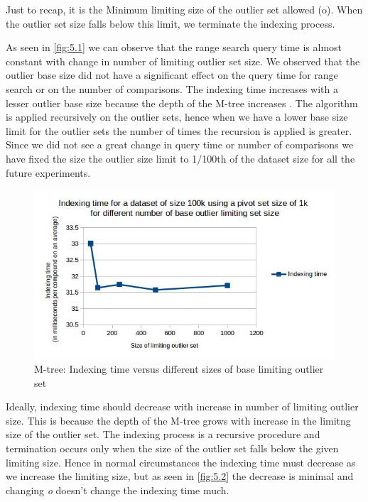 Just to recap, it is the Minimum limiting size of the outlier set allowed (o). When the outlier set size falls below this limit, we terminate the indexing process.

As seen in \ref{fig:5.1} we can observe that the range search query time is almost constant with change in number of limiting outlier set size. We observed that the outlier base size did not have a significant effect on the query time for range search or on the number of comparisons. The indexing time increases with a lesser outlier base size because the depth of the M-tree increases . The algorithm is applied recursively on the outlier sets, hence when we have a lower base size limit for the outlier sets the number of times the recursion is applied is greater. Since we did not see a great change in query time or number of comparisons we have fixed the size the outlier size limit to 1/100th of the dataset size for all the future experiments.


\begin{figure}[ht!]	
\centering
\includegraphics[width=1 \columnwidth]{img/image8.jpg}
\caption{M-tree: Indexing time versus different sizes of base limiting outlier set}
\label{fig:5.2}
\end{figure}


Ideally, indexing time should decrease with increase in number of limiting outlier size. This is because the depth of the M-tree grows with increase in the limitng size of the outlier set. The indexing process is a recursive procedure and termination occurs only when the size of the outlier set falls below the given limiting size. Hence in normal circumstances the indexing time must decrease as we increase the limiting size, but as seen in \autoref{fig:5.2} the decrease is minimal and changing \textit{o} doesn't change the indexing time much. 






